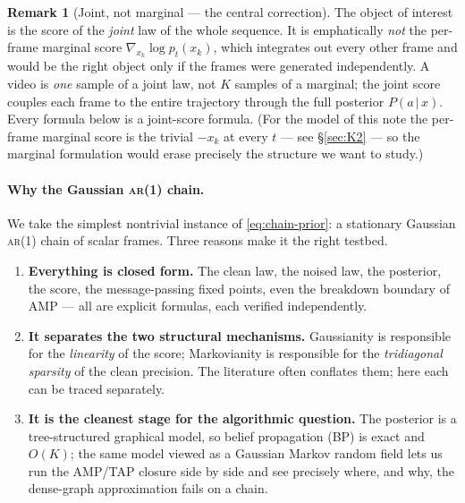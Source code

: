 \documentclass[11pt]{article}
\theoremstyle{definition}
\newtheorem{remark}{Remark}
\newcommand{\given}{\,|\,}
\begin{document}
\begin{remark}[Joint, not marginal --- the central correction]\label{rmk:joint}
The object of interest is the score of the \emph{joint} law of the whole
sequence. It is emphatically \emph{not} the per-frame marginal score
$\nabla_{x_k}\log p_t(x_k)$, which integrates out every other frame and would
be the right object only if the frames were generated independently. A video
is \emph{one} sample of a joint law, not $K$ samples of a marginal; the joint
score couples each frame to the entire trajectory through the full posterior
$P(a\given x)$. Every formula below is a joint-score formula. (For the
model of this note the per-frame marginal score is the trivial $-x_k$ at every
$t$ --- see \S\ref{sec:K2} --- so the marginal formulation would erase
precisely the structure we want to study.)
\end{remark}

\paragraph{Why the Gaussian \textsc{ar}(1) chain.}
We take the simplest nontrivial instance of \eqref{eq:chain-prior}: a
stationary Gaussian \textsc{ar}(1) chain of scalar frames. Three reasons make
it the right testbed.
\begin{enumerate}[leftmargin=1.6em, itemsep=1pt]
\item \textbf{Everything is closed form.} The clean law, the noised law, the
posterior, the score, the message-passing fixed points, even the breakdown
boundary of AMP --- all are explicit formulas, each verified independently.
\item \textbf{It separates the two structural mechanisms.} Gaussianity is
responsible for the \emph{linearity} of the score; Markovianity is responsible
for the \emph{tridiagonal sparsity} of the clean precision. The literature
often conflates them; here each can be traced separately.
\item \textbf{It is the cleanest stage for the algorithmic question.} The
posterior is a tree-structured graphical model, so belief propagation (BP) is
exact and $O(K)$; the same model viewed as a Gaussian Markov random field lets
us run the AMP/TAP closure side by side and see precisely where, and why, the
dense-graph approximation fails on a chain.
\end{enumerate}
\end{document}
